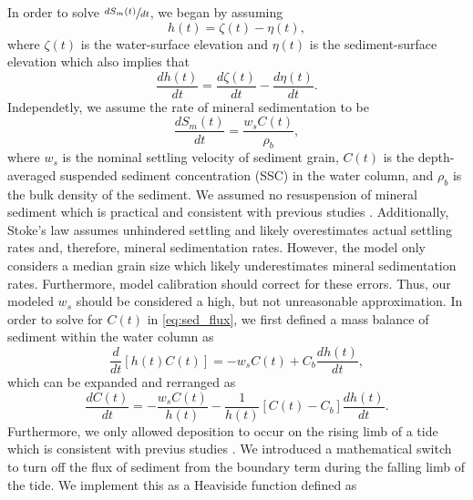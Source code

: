 In order to solve $\sfrac{dS_m(t)}{dt}$, we began by assuming
\begin{equation}\label{eq:depth}
	h(t) = \zeta(t) - \eta(t),
\end{equation}
where $\zeta(t)$ is the water-surface elevation and $\eta(t)$ is the sediment-surface elevation which also implies that
\begin{equation}\label{eq:depth_dt}
	\frac{dh(t)}{dt} = \frac{d\zeta(t)}{dt} - \frac{d\eta(t)}{dt}.
\end{equation}
Independetly, we assume the rate of mineral sedimentation to be
\begin{equation}\label{eq:sed_flux}
	\frac{dS_m(t)}{dt} = \frac{w_sC(t)}{\rho_b},
\end{equation}
where $w_s$ is the nominal settling velocity of sediment grain, $C(t)$ is the depth-averaged suspended sediment concentration (SSC) in the water column, and $\rho_b$ is the bulk density of the sediment. We assumed no resuspension of mineral sediment which is practical and consistent with previous studies \citep{kroneMethodSimulatingMarsh1987, allenSaltmarshGrowthStratification1990, frenchNumericalSimulationVertical1993, temmermanModellingLongtermTidal2003, temmermanModellingEstuarineVariations2004}. Additionally, Stoke's law assumes unhindered settling and likely overestimates actual settling rates and, therefore, mineral sedimentation rates. However, the model only considers a median grain size which likely underestimates mineral sedimentation rates. Furthermore, model calibration should correct for these errors. Thus, our modeled $w_s$ should be considered a high, but not unreasonable approximation. In order to solve for $C(t)$ in \autoref{eq:sed_flux}, we first defined a mass balance of sediment within the water column as
\begin{equation}\label{eq:conc_mass_bal}
	\frac{d}{dt}[h(t)C(t)] = -w_s C(t) + C_b \frac{dh(t)}{dt},
\end{equation}
which can be expanded and rerranged as
\begin{equation}\label{eq:conc_dt}
	\frac{dC(t)}{dt} = - \frac{w_sC(t)}{h(t)} - \frac{1}{h(t)}[C(t) - C_b]\frac{dh(t)}{dt}.
\end{equation}
Furthermore, we only allowed deposition to occur on the rising limb of a tide which is consistent with previus studies \citep{kroneMethodSimulatingMarsh1987, allenSaltmarshGrowthStratification1990, frenchNumericalSimulationVertical1993, temmermanModellingLongtermTidal2003, temmermanModellingEstuarineVariations2004}. We introduced a mathematical switch to turn off the flux of sediment from the boundary term during the falling limb of the tide. We implement this as a Heaviside function defined as
